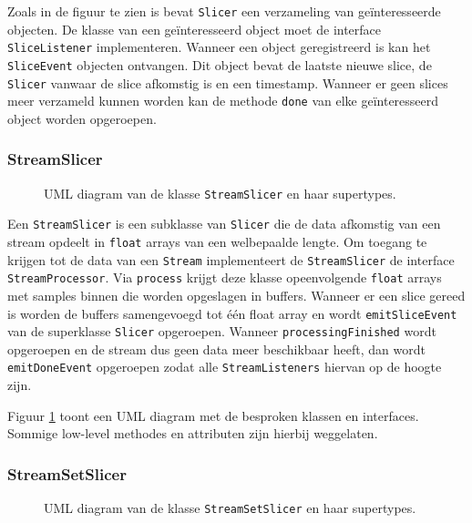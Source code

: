 Zoals in de figuur te zien is bevat \texttt{Slicer} een verzameling van geïnteresseerde objecten. De klasse van een geïnteresseerd object moet de interface \texttt{SliceListener} implementeren. Wanneer een object geregistreerd is kan het \texttt{SliceEvent} objecten ontvangen. Dit object bevat de laatste nieuwe slice, de \texttt{Slicer} vanwaar de slice afkomstig is en een timestamp. Wanneer er geen slices meer verzameld kunnen worden kan de methode \texttt{done} van elke geïnteresseerd object worden opgeroepen.

\subsubsection{StreamSlicer}

\begin{figure}[h!]
	\captionsetup{width=0.7\textwidth}
	\caption{UML diagram van de klasse \texttt{StreamSlicer} en haar supertypes.}
	\begin{center}
		\advance\parskip0.3cm
		
	\end{center}
	\label{streamSlicer}
\end{figure}

Een \texttt{StreamSlicer} is een subklasse van \texttt{Slicer} die de data afkomstig van een stream opdeelt in \texttt{float} arrays van een welbepaalde lengte. Om toegang te krijgen tot de data van een \texttt{Stream} implementeert de \texttt{StreamSlicer} de interface \texttt{StreamProcessor}. Via \texttt{process} krijgt deze klasse opeenvolgende \texttt{float} arrays met samples binnen die worden opgeslagen in buffers. Wanneer er een slice gereed is worden de buffers samengevoegd tot één float array en wordt \texttt{emitSliceEvent} van de superklasse \texttt{Slicer} opgeroepen. Wanneer \texttt{processingFinished} wordt opgeroepen en de stream dus geen data meer beschikbaar heeft, dan wordt \texttt{emitDoneEvent} opgeroepen zodat alle \texttt{StreamListeners} hiervan op de hoogte zijn.

Figuur \ref{streamSlicer} toont een UML diagram met de besproken klassen en interfaces. Sommige low-level methodes en attributen zijn hierbij weggelaten. 

\subsubsection{StreamSetSlicer}

\begin{figure}[h!]
	\captionsetup{width=0.7\textwidth}
	\caption{UML diagram van de klasse \texttt{StreamSetSlicer} en haar supertypes.}
	\begin{center}
		\advance\parskip0.3cm
		
	\end{center}
	\label{streamSetSlicer}
\end{figure}

